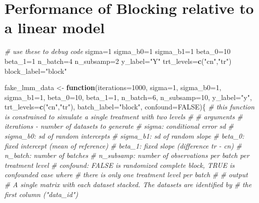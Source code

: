 \documentclass[]{book}
\newenvironment{Shaded}{\begin{snugshade}}{\end{snugshade}}
\newcommand{\CommentTok}[1]{\textcolor[rgb]{0.56,0.35,0.01}{\textit{#1}}}
\newcommand{\ControlFlowTok}[1]{\textcolor[rgb]{0.13,0.29,0.53}{\textbf{#1}}}
\newcommand{\DataTypeTok}[1]{\textcolor[rgb]{0.13,0.29,0.53}{#1}}
\newcommand{\DecValTok}[1]{\textcolor[rgb]{0.00,0.00,0.81}{#1}}
\newcommand{\KeywordTok}[1]{\textcolor[rgb]{0.13,0.29,0.53}{\textbf{#1}}}
\newcommand{\NormalTok}[1]{#1}
\newcommand{\OtherTok}[1]{\textcolor[rgb]{0.56,0.35,0.01}{#1}}
\newcommand{\StringTok}[1]{\textcolor[rgb]{0.31,0.60,0.02}{#1}}
\begin{document}
\hypertarget{performance-of-blocking-relative-to-a-linear-model}{%
\section{Performance of Blocking relative to a linear model}\label{performance-of-blocking-relative-to-a-linear-model}}

\begin{Shaded}
\begin{Highlighting}[]
\CommentTok{# use these to debug code}
\NormalTok{sigma=}\DecValTok{1}
\NormalTok{sigma_b0=}\DecValTok{1}
\NormalTok{sigma_b1=}\DecValTok{1}
\NormalTok{beta_}\DecValTok{0}\NormalTok{=}\DecValTok{10}
\NormalTok{beta_}\DecValTok{1}\NormalTok{=}\DecValTok{1}
\NormalTok{n_batch=}\DecValTok{4}
\NormalTok{n_subsamp=}\DecValTok{2}
\NormalTok{y_label=}\StringTok{"Y"}
\NormalTok{trt_levels=}\KeywordTok{c}\NormalTok{(}\StringTok{"cn"}\NormalTok{,}\StringTok{"tr"}\NormalTok{)}
\NormalTok{block_label=}\StringTok{"block"}

\NormalTok{fake_lmm_data <-}\StringTok{ }\ControlFlowTok{function}\NormalTok{(}\DataTypeTok{iterations=}\DecValTok{1000}\NormalTok{, }\DataTypeTok{sigma=}\DecValTok{1}\NormalTok{, }\DataTypeTok{sigma_b0=}\DecValTok{1}\NormalTok{, }\DataTypeTok{sigma_b1=}\DecValTok{1}\NormalTok{, }\DataTypeTok{beta_0=}\DecValTok{10}\NormalTok{, }\DataTypeTok{beta_1=}\DecValTok{1}\NormalTok{, }\DataTypeTok{n_batch=}\DecValTok{6}\NormalTok{, }\DataTypeTok{n_subsamp=}\DecValTok{10}\NormalTok{, }\DataTypeTok{y_label=}\StringTok{"y"}\NormalTok{, }\DataTypeTok{trt_levels=}\KeywordTok{c}\NormalTok{(}\StringTok{"cn"}\NormalTok{,}\StringTok{"tr"}\NormalTok{), }\DataTypeTok{batch_label=}\StringTok{"block"}\NormalTok{, }\DataTypeTok{confound=}\OtherTok{FALSE}\NormalTok{)\{}
  \CommentTok{# this function is constrained to simulate a single treatment with two levels}
  \CommentTok{#}
  \CommentTok{#                   arguments }
  \CommentTok{# iterations - number of datasets to generate}
  \CommentTok{# sigma: conditional error sd}
  \CommentTok{# sigma_b0: sd of random intercepts}
  \CommentTok{# sigma_b1: sd of random slope}
  \CommentTok{# beta_0: fixed intercept (mean of reference)}
  \CommentTok{# beta_1: fixed slope (difference tr - cn)}
  \CommentTok{# n_batch: number of batches}
  \CommentTok{# n_subsamp: number of observations per batch per treatment level}
  \CommentTok{# confound: FALSE is randomized complete block, TRUE is confounded case where}
  \CommentTok{#       there is only one treatment level per batch}
  \CommentTok{#}
  \CommentTok{#                    output}
  \CommentTok{# A single matrix with each dataset stacked. The datasets are identified by}
  \CommentTok{# the first column ("data_id")}
  

\end{Highlighting}
\end{Shaded}
\end{document}
